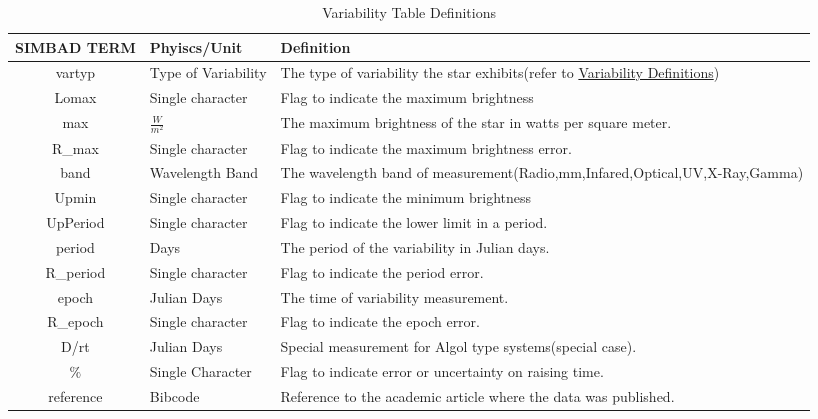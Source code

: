 \documentclass[12pt,oneside,a4paper,english]{article}
\begin{document}
\begin{table}[H]
    \centering
    \caption{Variability Table Definitions}
    \begin{tabular}{|c|p{3cm}|p{9cm}|}
    \centering
    \textbf{SIMBAD TERM} & \textbf{Phyiscs/Unit} & \textbf{Definition} \\ \hline \hline
    vartyp & Type of Variability & The type of variability the star exhibits(refer to \href{https://simbad.u-strasbg.fr/Pages/guide/chG.htx#v}{Variability Definitions}) \\ \hline
    Lomax & Single character & Flag to indicate the maximum brightness  \\ \hline
    max & $\frac{W}{m^2}$ & The maximum brightness of the star in watts per square meter.  \\ \hline
    R\_max & Single character & Flag to indicate the maximum brightness error.  \\ \hline
    band & Wavelength Band & The wavelength band of measurement(Radio,mm,Infared,Optical,UV,X-Ray,Gamma)\\ \hline
    Upmin & Single character & Flag to indicate the minimum brightness  \\ \hline
    UpPeriod & Single character & Flag to indicate the lower limit in a period.  \\ \hline
    period & Days & The period of the variability in Julian days.  \\ \hline
    R\_period & Single character & Flag to indicate the period error.  \\ \hline
    epoch & Julian Days & The time of variability measurement.  \\ \hline
    R\_epoch & Single character & Flag to indicate the epoch error.  \\ \hline
    D/rt & Julian Days & Special measurement for Algol type systems(special case). \\ \hline
    $\%$ & Single Character & Flag to indicate error or uncertainty on raising time.  \\ \hline
    reference & Bibcode & Reference to the academic article where the data was published.  \\ \hline
    \end{tabular}
    \label{tab:table3}
    \end{table}
\end{document}
